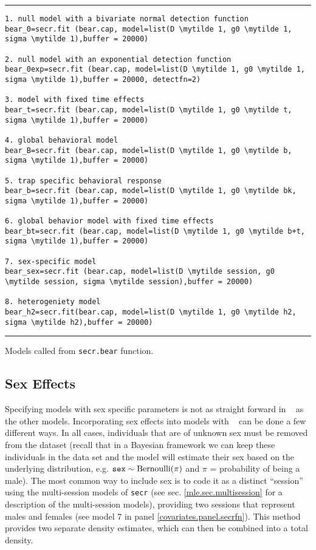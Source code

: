 \begin{panel}[htp]
\centering
\rule[0.1in]{\textwidth}{.03in}
{\small
\begin{Verbatim}[commandchars=\\\{\}]
1. null model with a bivariate normal detection function
bear_0=secr.fit (bear.cap, model=list(D \mytilde 1, g0 \mytilde 1, sigma \mytilde 1),buffer = 20000)

2. null model with an exponential detection function
bear_0exp=secr.fit (bear.cap, model=list(D \mytilde 1, g0 \mytilde 1, sigma \mytilde 1),buffer = 20000, detectfn=2)

3. model with fixed time effects
bear_t=secr.fit (bear.cap, model=list(D \mytilde 1, g0 \mytilde t, sigma \mytilde 1),buffer = 20000)

4. global behavioral model
bear_B=secr.fit (bear.cap, model=list(D \mytilde 1, g0 \mytilde b, sigma \mytilde 1),buffer = 20000)

5. trap specific behavioral response
bear_b=secr.fit (bear.cap, model=list(D \mytilde 1, g0 \mytilde bk, sigma \mytilde 1),buffer = 20000)

6. global behavior model with fixed time effects
bear_bt=secr.fit (bear.cap, model=list(D \mytilde 1, g0 \mytilde b+t, sigma \mytilde 1),buffer = 20000)

7. sex-specific model
bear_sex=secr.fit (bear.cap, model=list(D \mytilde session, g0 \mytilde session, sigma \mytilde session),buffer = 20000)

8. heterogeniety model
bear_h2=secr.fit(bear.cap, model=list(D \mytilde 1, g0 \mytilde h2, sigma \mytilde h2),buffer = 20000)
\end{Verbatim}
}

\rule[-0.1in]{\textwidth}{.03in}
\caption{
Models called from \mbox{\tt secr.bear} function. }
\label{covariates.panel.secrfn}
\end{panel}


\subsection{Sex Effects}
\label{covariates.secr.sex}

Specifying models with sex specific parameters is not as straight
forward in \secr~ as the other models.  Incorporating sex effects into
models with \secr~ can be done a few different ways.  In all cases,
individuals that are of unknown sex must be removed from the dataset
(recall that in a Bayesian framework we can keep these individuals in
the data set and the model will estimate their sex based on the
underlying distribution, e.g. $\mbox{\tt sex} \sim \mbox{Bernoulli}(\pi)$ and $\pi$ =
probability of being a male).  The most common way to include sex is
to code it as a distinct ``session'' using the multi-session models of
\mbox{\tt secr} (see sec. \ref{mle.sec.multisession} for a description
of the multi-session models), providing two sessions that represent
males and females (see model 7 in panel
\ref{covariates.panel.secrfn}).  This method provides two separate
density estimates, which can then be combined into a total density.


